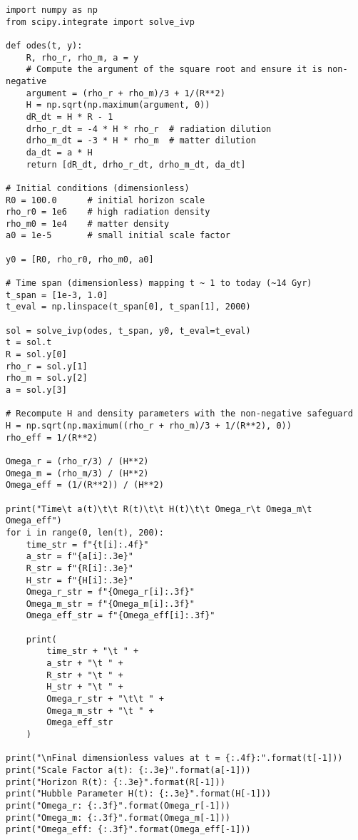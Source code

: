 \documentclass[12pt]{article}
\begin{document}
\begin{verbatim}
import numpy as np
from scipy.integrate import solve_ivp

def odes(t, y):
    R, rho_r, rho_m, a = y
    # Compute the argument of the square root and ensure it is non-negative
    argument = (rho_r + rho_m)/3 + 1/(R**2)
    H = np.sqrt(np.maximum(argument, 0))
    dR_dt = H * R - 1
    drho_r_dt = -4 * H * rho_r  # radiation dilution
    drho_m_dt = -3 * H * rho_m  # matter dilution
    da_dt = a * H
    return [dR_dt, drho_r_dt, drho_m_dt, da_dt]

# Initial conditions (dimensionless)
R0 = 100.0      # initial horizon scale
rho_r0 = 1e6    # high radiation density
rho_m0 = 1e4    # matter density
a0 = 1e-5       # small initial scale factor

y0 = [R0, rho_r0, rho_m0, a0]

# Time span (dimensionless) mapping t ~ 1 to today (~14 Gyr)
t_span = [1e-3, 1.0]
t_eval = np.linspace(t_span[0], t_span[1], 2000)

sol = solve_ivp(odes, t_span, y0, t_eval=t_eval)
t = sol.t
R = sol.y[0]
rho_r = sol.y[1]
rho_m = sol.y[2]
a = sol.y[3]

# Recompute H and density parameters with the non-negative safeguard
H = np.sqrt(np.maximum((rho_r + rho_m)/3 + 1/(R**2), 0))
rho_eff = 1/(R**2)

Omega_r = (rho_r/3) / (H**2)
Omega_m = (rho_m/3) / (H**2)
Omega_eff = (1/(R**2)) / (H**2)

print("Time\t a(t)\t\t R(t)\t\t H(t)\t\t Omega_r\t Omega_m\t Omega_eff")
for i in range(0, len(t), 200):
    time_str = f"{t[i]:.4f}"
    a_str = f"{a[i]:.3e}"
    R_str = f"{R[i]:.3e}"
    H_str = f"{H[i]:.3e}"
    Omega_r_str = f"{Omega_r[i]:.3f}"
    Omega_m_str = f"{Omega_m[i]:.3f}"
    Omega_eff_str = f"{Omega_eff[i]:.3f}"

    print(
        time_str + "\t " +
        a_str + "\t " +
        R_str + "\t " +
        H_str + "\t " +
        Omega_r_str + "\t\t " +
        Omega_m_str + "\t " +
        Omega_eff_str
    )

print("\nFinal dimensionless values at t = {:.4f}:".format(t[-1]))
print("Scale Factor a(t): {:.3e}".format(a[-1]))
print("Horizon R(t): {:.3e}".format(R[-1]))
print("Hubble Parameter H(t): {:.3e}".format(H[-1]))
print("Omega_r: {:.3f}".format(Omega_r[-1]))
print("Omega_m: {:.3f}".format(Omega_m[-1]))
print("Omega_eff: {:.3f}".format(Omega_eff[-1]))
\end{verbatim}
\end{document}
